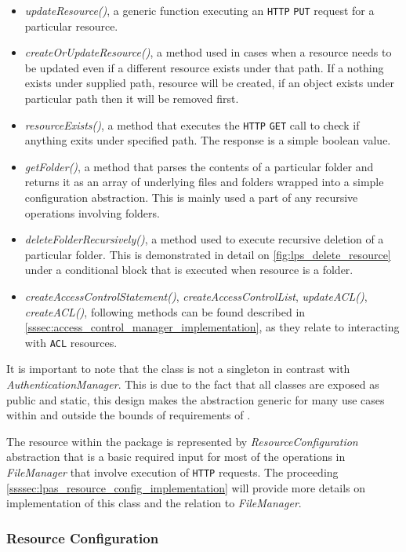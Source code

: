 \begin{itemize}
    \item \textit{updateResource()}, a generic function executing an \texttt{HTTP} \texttt{PUT} request for a particular resource.
    \item \textit{createOrUpdateResource()}, a method used in cases when a resource needs to be updated even if a different resource exists under that path. If a nothing exists under supplied path, resource will be created, if an object exists under particular path then it will be removed first.
    \item \textit{resourceExists()}, a method that executes the \texttt{HTTP} \texttt{GET} call to check if anything exits under specified path. The response is a simple boolean value.
    \item \textit{getFolder()}, a method that parses the contents of a particular folder and returns it as an array of underlying files and folders wrapped into a simple configuration abstraction. This is mainly used a part of any recursive operations involving folders.
    \item \textit{deleteFolderRecursively()}, a method used to execute recursive deletion of a particular folder. This is demonstrated in detail on \autoref{fig:lps_delete_resource} under a conditional block that is executed when resource is a folder.  
    \item \textit{createAccessControlStatement()}, \textit{createAccessControlList}, \textit{updateACL()}, \textit{createACL()}, following methods can be found described in \autoref{sssec:access_control_manager_implementation}, as they relate to interacting with \texttt{ACL} resources.
\end{itemize}

It is important to note that the class is not a singleton in contrast with \textit{AuthenticationManager}. This is due to the fact that all classes are exposed as public and static, this design makes the abstraction generic for many use cases within and outside the bounds of requirements of \lpa{}.

The \solid{} resource within the \lpas{} package is represented by \textit{ResourceConfiguration} abstraction that is a basic required input for most of the operations in \textit{FileManager} that involve execution of \texttt{HTTP} requests. The proceeding \autoref{ssssec:lpas_resource_config_implementation} will provide more details on implementation of this class and the relation to \textit{FileManager}.
 
\subsubsection{Resource Configuration}
\label{ssssec:lpas_resource_config_implementation}

